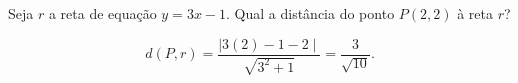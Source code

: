 \begin{exemplos}
    Seja $r$ a reta de equação $y = 3x - 1$. Qual a distância do ponto $P(2,2)$ à reta $r$?
    \begin{solucao}
        \[
            d(P,r) = \dfrac{\mid 3(2) - 1 - 2\mid}{\sqrt{3^2 + 1}} = \dfrac{3}{\sqrt{10}}.
        \]
    \end{solucao}
\end{exemplos}
